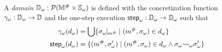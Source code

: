 \begin{definition}\label{def:symbdom}
  A \textit{{\sealed} domain} ${\mathbb{D}}_\omega: \mathcal{P}({\mathbb{M}}^{\#} \times
  {\mathbb{S}}_\omega)$ is defined with the concretization function
  ${\gamma}_\omega: {\mathbb{D}}_\omega \rightarrow \mathbb{D}$ and the {\sealed} one-step execution
  ${\textsf{step}}_\omega: {\mathbb{D}}_\omega \rightarrow {\mathbb{D}}_\omega$ such that
  \begin{align}
    {\gamma}_\omega({{d}_\omega}) &=
    \bigcup \{ {\sigma}_\omega\!\!\mid\!\!_{{m}^{\#}} \mid ({m}^{\#}, {\sigma}_\omega) \in
    {{d}_\omega}\}\\
    {\textsf{step}}_\omega({{d}_\omega}) &= \{ ({m}^{\#}, {\sigma}_\omega') \mid ({m}^{\#}, {\sigma}_\omega)
    \in {{d}_\omega} \wedge {\sigma}_\omega {\leadsto}_\omega {\sigma}_\omega' \}
  \end{align}
\end{definition}
